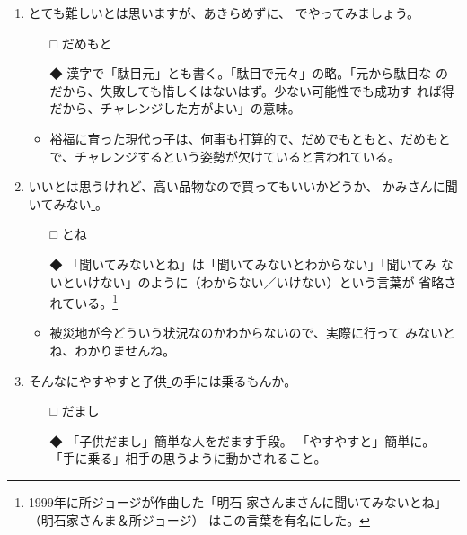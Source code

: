 \documentclass[
uplatex,
b5paper,
10pt,
dvipdfmx
]{jsbook}
\begin{document}
\begin{enumerate}
 \item とても難しいとは思いますが、あきらめずに、
       \underline{   }でやってみましょう。

 \begin{itemize}
  \item[□] だめもと
  \item[◆] 漢字で「駄目元」とも書く。「駄目で元々」の略。「元から駄目な
	    のだから、失敗しても惜しくはないはず。少ない可能性でも成功す
	    れば得だから、チャレンジした方がよい」の意味。
 \end{itemize}

 \begin{itemize}
  \item 裕福に育った現代っ子は、何事も打算的で、だめでもともと、だめもと
	で、チャレンジするという姿勢が欠けていると言われている。
 \end{itemize}

 \item いいとは思うけれど、高い品物なので買ってもいいかどうか、
       かみさんに聞いてみない\underline{   }。

 \begin{itemize}
  \item[□] とね
  \item[◆] 「聞いてみないとね」は「聞いてみないとわからない」「聞いてみ
	    ないといけない」のように（わからない／いけない）という言葉が
	    省略されている。\footnote{1999年に所ジョージが作曲した「明石
	    家さんまさんに聞いてみないとね」（明石家さんま＆所ジョージ）
	    はこの言葉を有名にした。}
 \end{itemize}

 \begin{itemize}
  \item 被災地が今どういう状況なのかわからないので、実際に行って
	みないとね、わかりませんね。
 \end{itemize}


 \item そんなにやすやすと子供\underline{   }の手には乗るもんか。


 \begin{itemize}
  \item[□] だまし
  \item[◆] 「子供だまし」簡単な人をだます手段。
       「やすやすと」簡単に。
       「手に乗る」相手の思うように動かされること。
 \end{itemize}


\end{enumerate}
\end{document}
